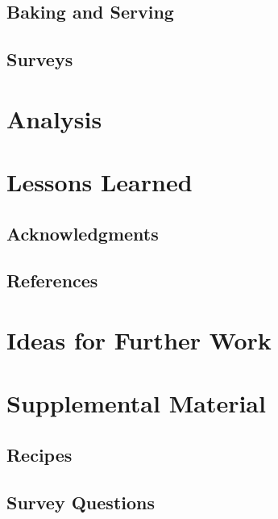 \documentclass[11pt, a4paper]{article}
\begin{document}
		\subsection*{Baking and Serving}
		\subsection*{Surveys}
		\section{Analysis}	
		\section{Lessons Learned}
		\subsection*{Acknowledgments}
		\subsection*{References}
		\section{Ideas for Further Work}
		\section{Supplemental Material}
		\subsection*{Recipes}
		\subsection*{Survey Questions}
	
	
\end{document}
